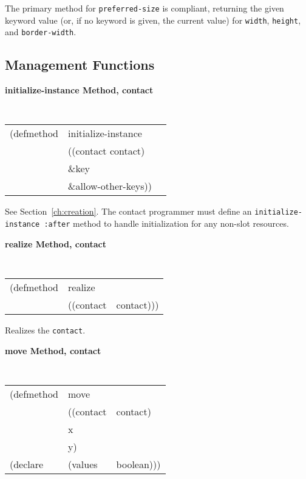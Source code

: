 \documentclass[twoside]{book}
\begin{document}
\begin{sloppy}
\begin{flushright}\parbox[t]{6.125in}{
The primary method for {\tt preferred-size} is compliant, returning the
given keyword value (or, if no keyword is given, the current value) for {\tt width},
{\tt height}, and {\tt border-width}.}\end{flushright}

{\samepage
\subsection*{Management Functions}
{\large {\bf initialize-instance \hfill Method, contact}}
\begin{flushright} \parbox[t]{6.125in}{
\tt
\begin{tabular}{lll}
\raggedright
(defmethod & initialize-instance & \\
& ((contact  contact)\\
& \&key \\
& \&allow-other-keys))
\end{tabular}
\rm

}\end{flushright}
}

\begin{flushright} \parbox[t]{6.125in}{
See Section~\ref{ch:creation}. The contact programmer must define an
{\tt initialize-instance :after} method to  
handle initialization for any non-slot resources.
 
}\end{flushright}



{\large {\bf realize \hfill Method, contact}}
\begin{flushright} \parbox[t]{6.125in}{
\tt
\begin{tabular}{lll}
\raggedright
(defmethod & realize & \\
& ((contact  &contact)))
\end{tabular}
\rm

}\end{flushright}

\begin{flushright} \parbox[t]{6.125in}{
Realizes the {\tt contact}.
}\end{flushright}

{\samepage
{\large {\bf move \hfill Method, contact}}
\begin{flushright}
\parbox[t]{6.125in}{
\tt
\begin{tabular}{lll}
\raggedright
(defmethod & move & \\
& ((contact  &contact)\\
& x & \\
& y)\\
(declare & (values & boolean)))
\end{tabular}
\rm
}\end{flushright}
}


\end{sloppy}
\end{document}
